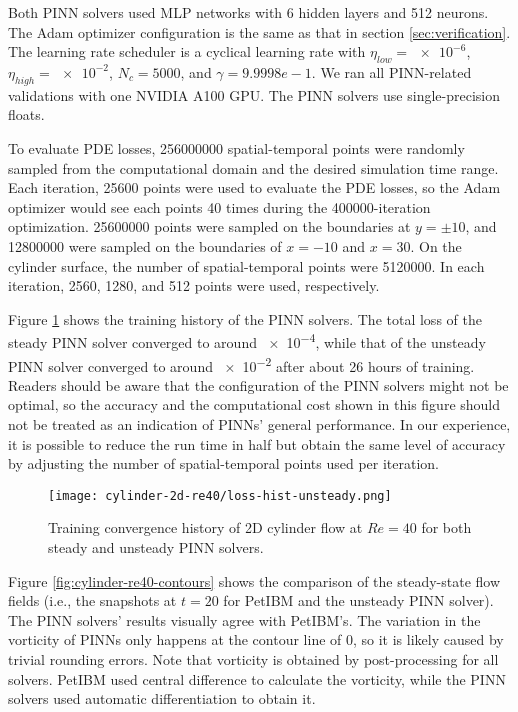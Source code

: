 Both PINN solvers used MLP networks with \num{6} hidden layers and \num{512} neurons.
The Adam optimizer configuration is the same as that in section \ref{sec:verification}.
The learning rate scheduler is a cyclical learning rate with $\eta_{low}=\num{e-6}$, $\eta_{high}=\num{e-2}$, $N_c=\num{5000}$, and $\gamma={9.9998e-1}$.
We ran all PINN-related validations with one NVIDIA A100 GPU.
The PINN solvers use single-precision floats.

To evaluate PDE losses, \num{256000000} spatial-temporal points were randomly sampled from the computational domain and the desired simulation time range.
Each iteration, \num{25600} points were used to evaluate the PDE losses, so the Adam optimizer would see each points \num{40} times during the \num{400000}-iteration optimization.
\num{25600000} points were sampled on the boundaries at $y=\pm 10$, and \num{12800000} were sampled on the boundaries of $x=-10$ and $x=30$.
On the cylinder surface, the number of spatial-temporal points were \num{5120000}.
In each iteration, \num{2560}, \num{1280}, and \num{512} points were used, respectively.

Figure \ref{fig:cylinder-re40-pinn-loss} shows the training history of the PINN solvers.
The total loss of the steady PINN solver converged to around \num{e-4}, while that of the unsteady PINN solver converged to around \num{e-2} after about 26 hours of training.
Readers should be aware that the configuration of the PINN solvers might not be optimal, so the accuracy and the computational cost shown in this figure should not be treated as an indication of PINNs' general performance.
In our experience, it is possible to reduce the run time in half but obtain the same level of accuracy by adjusting the number of spatial-temporal points used per iteration.

\begin{figure}
    \centering%
    \texttt{[image: cylinder-2d-re40/loss-hist-unsteady.png]}%
    \caption{%
        Training convergence history of 2D cylinder flow at $Re=\num{40}$ for both steady and unsteady PINN solvers.
    }
    \label{fig:cylinder-re40-pinn-loss}%
\end{figure}

Figure \ref{fig:cylinder-re40-contours} shows the comparison of the steady-state flow fields (i.e., the snapshots at $t=20$ for PetIBM and the unsteady PINN solver).
The PINN solvers' results visually agree with PetIBM's.
The variation in the vorticity of PINNs only happens at the contour line of \num{0}, so it is likely caused by trivial rounding errors.
Note that vorticity is obtained by post-processing for all solvers.
PetIBM used central difference to calculate the vorticity, while the PINN solvers used automatic differentiation to obtain it.

